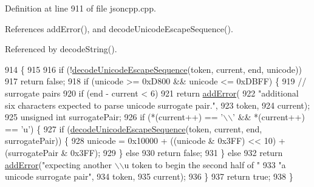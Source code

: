 Definition at line 911 of file jsoncpp.\+cpp.



References add\+Error(), and decode\+Unicode\+Escape\+Sequence().



Referenced by decode\+String().


\begin{DoxyCode}
914                                                            \{
915 
916   \textcolor{keywordflow}{if} (!\hyperlink{class_json_1_1_reader_a469cb6f55971d7c41fca2752a3aa5bf7}{decodeUnicodeEscapeSequence}(token, current, end, unicode))
917     \textcolor{keywordflow}{return} \textcolor{keyword}{false};
918   \textcolor{keywordflow}{if} (unicode >= 0xD800 && unicode <= 0xDBFF) \{
919     \textcolor{comment}{// surrogate pairs}
920     \textcolor{keywordflow}{if} (end - current < 6)
921       \textcolor{keywordflow}{return} \hyperlink{class_json_1_1_reader_af02176a1d2786b4415bbb00a1b10bb6b}{addError}(
922           \textcolor{stringliteral}{"additional six characters expected to parse unicode surrogate pair."},
923           token,
924           current);
925     \textcolor{keywordtype}{unsigned} \textcolor{keywordtype}{int} surrogatePair;
926     \textcolor{keywordflow}{if} (*(current++) == \textcolor{charliteral}{'\(\backslash\)\(\backslash\)'} && *(current++) == \textcolor{charliteral}{'u'}) \{
927       \textcolor{keywordflow}{if} (\hyperlink{class_json_1_1_reader_a469cb6f55971d7c41fca2752a3aa5bf7}{decodeUnicodeEscapeSequence}(token, current, end, surrogatePair)) \{
928         unicode = 0x10000 + ((unicode & 0x3FF) << 10) + (surrogatePair & 0x3FF);
929       \} \textcolor{keywordflow}{else}
930         \textcolor{keywordflow}{return} \textcolor{keyword}{false};
931     \} \textcolor{keywordflow}{else}
932       \textcolor{keywordflow}{return} \hyperlink{class_json_1_1_reader_af02176a1d2786b4415bbb00a1b10bb6b}{addError}(\textcolor{stringliteral}{"expecting another \(\backslash\)\(\backslash\)u token to begin the second half of "}
933                       \textcolor{stringliteral}{"a unicode surrogate pair"},
934                       token,
935                       current);
936   \}
937   \textcolor{keywordflow}{return} \textcolor{keyword}{true};
938 \}
\end{DoxyCode}
\mbox{\label{class_json_1_1_reader_a469cb6f55971d7c41fca2752a3aa5bf7}} 

